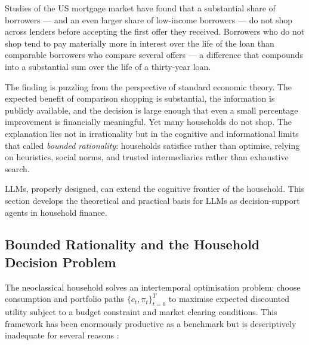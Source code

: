 \begin{context}

Studies of the US mortgage market have found that a substantial share of borrowers --- and an even larger share of low-income borrowers --- do not shop across lenders before accepting the first offer they received. Borrowers who do not shop tend to pay materially more in interest over the life of the loan than comparable borrowers who compare several offers --- a difference that compounds into a substantial sum over the life of a thirty-year loan.

The finding is puzzling from the perspective of standard economic theory. The expected benefit of comparison shopping is substantial, the information is publicly available, and the decision is large enough that even a small percentage improvement is financially meaningful. Yet many households do not shop. The explanation lies not in irrationality but in the cognitive and informational limits that \citet{simon1955behavioral} called \emph{bounded rationality}: households satisfice rather than optimise, relying on heuristics, social norms, and trusted intermediaries rather than exhaustive search.

LLMs, properly designed, can extend the cognitive frontier of the household. This section develops the theoretical and practical basis for LLMs as decision-support agents in household finance.

\subsection{Bounded Rationality and the Household Decision Problem}
\label{subsec:bounded-rationality}

The neoclassical household solves an intertemporal optimisation problem: choose consumption and portfolio paths $\{c_t, \pi_t\}_{t=0}^T$ to maximise expected discounted utility subject to a budget constraint and market clearing conditions. This framework has been enormously productive as a benchmark but is descriptively inadequate for several reasons \cite{campbell2006household}:


\end{context}
